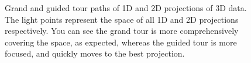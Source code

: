 \documentclass[
  letterpaper,
]{krantz}
\begin{document}
\begin{figure}

\begin{minipage}{0.50\linewidth}



\end{minipage}%
%
\begin{minipage}{0.50\linewidth}



\end{minipage}%

\caption{\label{fig-tour-paths-pdf}Grand and guided tour paths of 1D and
2D projections of 3D data. The light points represent the space of all
1D and 2D projections respectively. You can see the grand tour is more
comprehensively covering the space, as expected, whereas the guided tour
is more focused, and quickly moves to the best projection.
}

\end{figure}%
\end{document}
